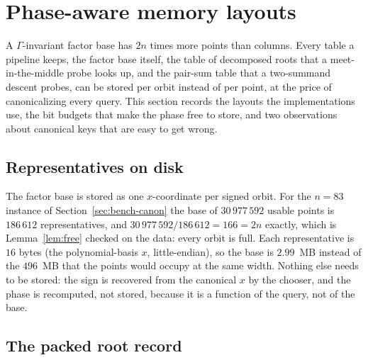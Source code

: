 \section{Phase-aware memory layouts}
\label{sec:layout}

A $\Gamma$-invariant factor base has $2n$ times more points than
columns. Every table a pipeline keeps, the factor base itself, the
table of decomposed roots that a meet-in-the-middle probe looks up, and
the pair-sum table that a two-summand descent probes, can be stored
per orbit instead of per point, at the price of canonicalizing every
query. This section records the layouts the implementations use, the
bit budgets that make the phase free to store, and two observations
about canonical keys that are easy to get wrong.

\subsection{Representatives on disk}

The factor base is stored as one $x$-coordinate per signed orbit. For
the $n=83$ instance of Section~\ref{sec:bench-canon} the base of
$30\,977\,592$ usable points is $186\,612$ representatives, and
$30\,977\,592/186\,612=166=2n$ exactly, which is Lemma~\ref{lem:free}
checked on the data: every orbit is full. Each representative is $16$
bytes (the polynomial-basis $x$, little-endian), so the base is
$2.99$~MB instead of the $496$~MB that the points would occupy at the
same width.
Nothing else needs to be stored: the sign is recovered from the
canonical $x$ by the chooser, and the phase is recomputed, not stored,
because it is a function of the query, not of the base.

\subsection{The packed root record}
\label{sec:record}

